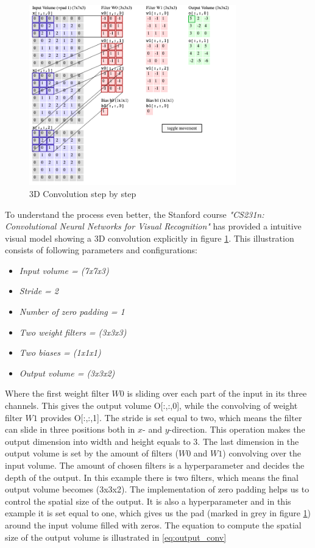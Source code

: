 \documentclass[USenglish]{ifimaster}  %
\begin{document}
\begin{figure}[H]
    \centering
    \includegraphics[width=0.8\textwidth]{bilder/conv2.png}
    \caption{3D Convolution step by step \cite{website:cs231n}}
    \label{fig:conv}
\end{figure}

To understand the process even better, the Stanford course \textit{"CS231n: Convolutional Neural Networks for Visual Recognition"} has provided a intuitive visual model showing a 3D convolution explicitly in figure \cref{fig:conv}. This illustration consists of following parameters and configurations:

\begin{itemize}
    \item \textit{Input volume = (7x7x3)}
    \item \textit{Stride = 2}
    \item \textit{Number of zero padding = 1}
    \item \textit{Two weight filters = (3x3x3)}
    \item \textit{Two biases = (1x1x1)}
    \item \textit{Output volume = (3x3x2)}
\end{itemize}

Where the first weight filter $W0$ is sliding over each part of the input in its three channels. This gives the output volume O[:,:,0], while the convolving of weight filter $W1$ provides O[:,:,1]. The stride is set equal to two, which means the filter can slide in three positions both in $x$- and $y$-direction. This operation makes the output dimension into width and height equals to 3. The last dimension in the output volume is set by the amount of filters ($W0$ and $W1$) convolving over the input volume. The amount of chosen filters is a hyperparameter and decides the depth of the output. In this example there is two filters, which means the final output volume becomes (3x3x2). 
The implementation of zero padding helps us to control the spatial size of the output. It is also a hyperparameter and in this example it is set equal to one, which gives us the pad (marked in grey in figure \cref{fig:conv}) around the input volume filled with zeros. 
\newline
\newline
The equation to compute the spatial size of the output volume is illustrated in \cref{eq:output_conv}
\end{document}
